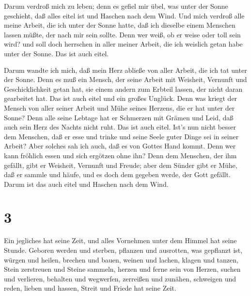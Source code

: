 Darum verdroß mich zu leben; denn es gefiel mir übel, was
unter der Sonne geschieht, daß alles eitel ist und Haschen nach dem
Wind.  Und mich verdroß alle meine Arbeit, die ich unter
der Sonne hatte, daß ich dieselbe einem Menschen lassen müßte, der nach
mir sein sollte.  Denn wer weiß, ob er weise oder toll sein
wird? und soll doch herrschen in aller meiner Arbeit, die ich weislich
getan habe unter der Sonne. Das ist auch eitel.

 Darum wandte ich mich, daß mein Herz abließe von aller
Arbeit, die ich tat unter der Sonne.  Denn es muß ein
Mensch, der seine Arbeit mit Weisheit, Vernunft und Geschicklichkeit
getan hat, sie einem andern zum Erbteil lassen, der nicht daran
gearbeitet hat. Das ist auch eitel und ein großes Unglück. 
Denn was kriegt der Mensch von aller seiner Arbeit und Mühe seines
Herzens, die er hat unter der Sonne?  Denn alle seine
Lebtage hat er Schmerzen mit Grämen und Leid, daß auch sein Herz des
Nachts nicht ruht. Das ist auch eitel.  Ist's nun nicht
besser dem Menschen, daß er esse und trinke und seine Seele guter Dinge
sei in seiner Arbeit? Aber solches sah ich auch, daß es von Gottes Hand
kommt.  Denn wer kann fröhlich essen und sich ergötzen ohne
ihn?  Denn dem Menschen, der ihm gefällt, gibt er Weisheit,
Vernunft und Freude; aber dem Sünder gibt er Mühe, daß er sammle und
häufe, und es doch dem gegeben werde, der Gott gefällt. Darum ist das
auch eitel und Haschen nach dem Wind.

\hypertarget{section-2}{%
\section{3}\label{section-2}}

 Ein jegliches hat seine Zeit, und alles Vornehmen unter dem
Himmel hat seine Stunde.  Geboren werden und sterben,
pflanzen und ausrotten, was gepflanzt ist,  würgen und
heilen, brechen und bauen,  weinen und lachen, klagen und
tanzen,  Stein zerstreuen und Steine sammeln, herzen und
ferne sein von Herzen,  suchen und verlieren, behalten und
wegwerfen,  zerreißen und zunähen, schweigen und reden,
 lieben und hassen, Streit und Friede hat seine Zeit.

